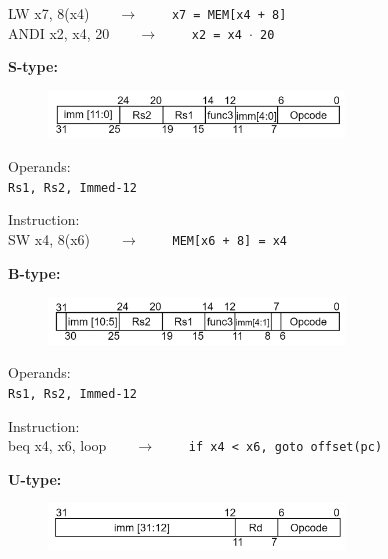 \begin{description}
\begin{description}
		\textsf{LW x7, 8(x4)}\ \ \ \ $\longrightarrow$ \ \ \ \ \texttt{x7 = MEM[x4 + 8]} \\
    \textsf{ANDI x2, x4, 20}\ \ \ \ $\longrightarrow$ \ \ \ \ \texttt{x2 = x4 $\cdot$ 20}
	\end{description}
	\item \textbf{S-type:}
  \begin{figure}[h]
    \center
    \includegraphics[width=0.7\textwidth]{sec1/images/Stype.png}
  \end{figure}
	\begin{description}
		\item Operands:\\
		\texttt{Rs1, Rs2, Immed-12}
		\item Instruction:\\
		\textsf{SW x4, 8(x6)}\ \ \ \ $\longrightarrow$ \ \ \ \ \texttt{MEM[x6 + 8] = x4}\\
	\end{description}
  \item \textbf{B-type:}
  \begin{figure}[h]
    \center
    \includegraphics[width=0.7\textwidth]{sec1/images/Btype.png}
  \end{figure}
	\begin{description}
		\item Operands:\\
		\texttt{Rs1, Rs2, Immed-12}
		\item Instruction:\\
		\textsf{beq x4, x6, loop}\ \ \ \ $\longrightarrow$ \ \ \ \ \texttt{if x4 < x6, goto offset(pc)}
	\end{description}
	\item \textbf{U-type:}
  \begin{figure}[h]
    \center
    \includegraphics[width=0.7\textwidth]{sec1/images/Utype.png}
  \end{figure}
	\begin{description}

\end{description}
\end{description}
